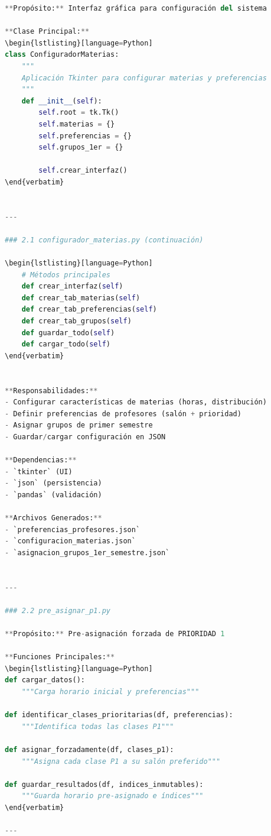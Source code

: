 \begin{itemize}
\begin{itemize}
\begin{itemize}
\begin{itemize}
\begin{itemize}
\begin{itemize}
\begin{enumerate}
\begin{enumerate}
\begin{enumerate}
\begin{enumerate}
\begin{lstlisting}[language=Python]
**Propósito:** Interfaz gráfica para configuración del sistema

**Clase Principal:**
\begin{lstlisting}[language=Python]
class ConfiguradorMaterias:
    """
    Aplicación Tkinter para configurar materias y preferencias
    """
    def __init__(self):
        self.root = tk.Tk()
        self.materias = {}
        self.preferencias = {}
        self.grupos_1er = {}
        
        self.crear_interfaz()
\end{verbatim}


---

### 2.1 configurador_materias.py (continuación)

\begin{lstlisting}[language=Python]
    # Métodos principales
    def crear_interfaz(self)
    def crear_tab_materias(self)
    def crear_tab_preferencias(self)
    def crear_tab_grupos(self)
    def guardar_todo(self)
    def cargar_todo(self)
\end{verbatim}


**Responsabilidades:**
- Configurar características de materias (horas, distribución)
- Definir preferencias de profesores (salón + prioridad)
- Asignar grupos de primer semestre
- Guardar/cargar configuración en JSON

**Dependencias:**
- `tkinter` (UI)
- `json` (persistencia)
- `pandas` (validación)

**Archivos Generados:**
- `preferencias_profesores.json`
- `configuracion_materias.json`
- `asignacion_grupos_1er_semestre.json`


---

### 2.2 pre_asignar_p1.py

**Propósito:** Pre-asignación forzada de PRIORIDAD 1

**Funciones Principales:**
\begin{lstlisting}[language=Python]
def cargar_datos():
    """Carga horario inicial y preferencias"""
    
def identificar_clases_prioritarias(df, preferencias):
    """Identifica todas las clases P1"""
    
def asignar_forzadamente(df, clases_p1):
    """Asigna cada clase P1 a su salón preferido"""
    
def guardar_resultados(df, indices_inmutables):
    """Guarda horario pre-asignado e índices"""
\end{verbatim}

---


\end{lstlisting}
\end{enumerate}
\end{enumerate}
\end{enumerate}
\end{enumerate}
\end{itemize}
\end{itemize}
\end{itemize}
\end{itemize}
\end{itemize}
\end{itemize}
